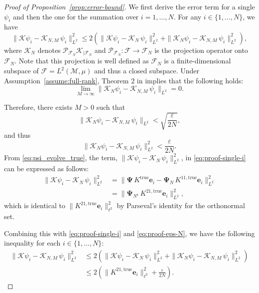 \documentclass{article}
\theoremstyle{plain}
\theoremstyle{definition}
\newcommand{\norm}[1]{\| #1 \|}
\def\Koop{\mathcal{K}}
\def\Fc{\mathcal{F}}
\def\Mc{\mathcal{M}}
\def\Pc{\mathcal{P}}
\begin{document}
\begin{proof}[Proof of Proposition~\ref{prop:error-bound}]
	We first derive the error term for a single $\psi_i$ and then the one for the summation over $i=1, \ldots, N$. For any $i \in \{1,\ldots,N\}$, we have
	\begin{equation}\label{eq:proof-single-i}
		\norm{\Koop \psi_i - \Koop_{N,M}\,\psi_i}_{L^2}^2 
		\leq
		2\left(\norm{\Koop \psi_i - \Koop_{N}\,\psi_i}_{L^2}^2  + \norm{\Koop_{N} \psi_i - \Koop_{N,M}\,\psi_i}_{L^2}^2\right),
	\end{equation}
	where $\Koop_N$ denotes $\Pc_{\Fc_N}\Koop_{|\Fc_N}$ and $\Pc_{\Fc_N} : \Fc \to \Fc_N$ is the projection operator onto $\Fc_N$. Note that this projection is well defined as $\Fc_N$ is a finite-dimensional subspace of $\Fc = L^2(\Mc, \mu)$ and thus a closed subspace. 
	Under Assumption~\ref{assume:full-rank},
	Theorem 2 in \cite{korda2018convergence} implies that the following holds:
	\begin{equation*}
		\lim_{M\to\infty}\norm{\Koop_{N} \psi_i - \Koop_{N,M}\,\psi_i}_{L^2} = 0.
	\end{equation*}
	
	Therefore, there exists $M>0$ such that 
	\begin{equation*}
		\norm{\Koop_{N} \psi_i - \Koop_{N,M}\,\psi_i}_{L^2} < \sqrt{\frac{\varepsilon}{2N}},
	\end{equation*}
	and thus 
	\begin{equation}\label{eq:proof-eps-N}
		\norm{\Koop_{N} \psi_i - \Koop_{N,M}\,\psi_i}_{L^2}^2 < \frac{\varepsilon}{2N}.
	\end{equation}
	From \eqref{eq:psi_evolve_true}, the term, $\norm{\Koop \psi_i - \Koop_{N}\,\psi_i}_{L^2}^2$, in \eqref{eq:proof-single-i} can be expressed as follows:
	\begin{align*}
		\norm{\Koop \psi_i - \Koop_{N}\,\psi_i}_{L^2}^2 & = \norm{\mathbf{\Psi}\,K^{\text{true}}\mathbf{e}_i - \mathbf{\Psi}_N\,K^{11,\text{true}}\mathbf{e}_i}_{L^2}^2 \\
		& = \norm{\mathbf{\Psi}_{N^\mathsf{c}}\,K^{21,\text{true}}\mathbf{e}_i}_{L^2}^2,
	\end{align*}
	which is identical to
	$\norm{K^{21,\text{true}}\mathbf{e}_i}_{\ell^2}^2$
	by Parseval's identity for the orthonormal set.
	
	Combining this with \eqref{eq:proof-single-i} and \eqref{eq:proof-eps-N}, we have the following inequality for each $i \in \{1,\ldots, N\}$: 
	\begin{align*}
		\norm{\Koop \psi_i - \Koop_{N,M}\,\psi_i}_{L^2}^2 
		&  \leq 
		2\left(\norm{\Koop \psi_i - \Koop_{N}\,\psi_i}_{L^2}^2  + \norm{\Koop_{N} \psi_i - \Koop_{N,M}\,\psi_i}_{L^2}^2\right)
		\\
		& \leq 2 \left( \norm{K^{21,\text{true}}\mathbf{e}_i}_{\ell^2}^2 + \frac{\varepsilon}{2N}\right).
	\end{align*}
	

\end{proof}
\end{document}
